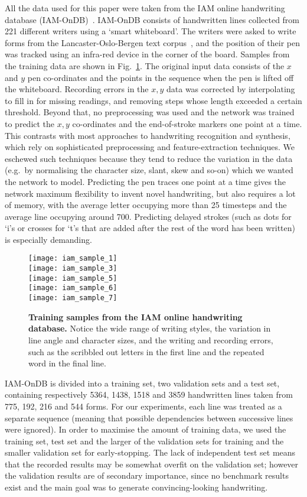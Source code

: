 \documentclass{article}
\newcommand{\eg}{e.g.\ }
\newcommand{\flabel}[1]{\label{fig:#1}}
\newcommand{\fref}[1]{Fig.~\ref{fig:#1}}
\begin{document}
All the data used for this paper were taken from the IAM online handwriting database (IAM-OnDB)~\cite{liwicki05iam}.
IAM-OnDB consists of handwritten lines collected from 221 different writers using a `smart whiteboard'.
The writers were asked to write forms from the Lancaster-Oslo-Bergen text corpus~\cite{lob}, and the position of their pen was tracked using an infra-red device in the corner of the board. 
Samples from the training data are shown in \fref{iam_data}.
The original input data consists of the $x$ and $y$ pen co-ordinates and the points in the sequence when the pen is lifted off the whiteboard.
Recording errors in the $x, y$ data was corrected by interpolating to fill in for missing readings, and removing steps whose length exceeded a certain threshold.
Beyond that, no preprocessing was used and the network was trained to predict the $x, y$ co-ordinates and the end-of-stroke markers one point at a time.
This contrasts with most approaches to handwriting recognition and synthesis, which rely on sophisticated preprocessing and feature-extraction techniques.
We eschewed such techniques because they tend to reduce the variation in the data (\eg by normalising the character size, slant, skew and so-on) which we wanted the network to model.
Predicting the pen traces one point at a time gives the network maximum flexibility to invent novel handwriting, but also requires a lot of memory, with the average letter occupying more than 25 timesteps and the average line occupying around 700.
Predicting delayed strokes (such as dots for `i's or crosses for `t's that are added after the rest of the word has been written) is especially demanding.

\begin{figure}
\texttt{[image: iam\_sample\_1]}\\
\texttt{[image: iam\_sample\_3]}\\
\texttt{[image: iam\_sample\_5]}\\
\texttt{[image: iam\_sample\_6]}\\
\texttt{[image: iam\_sample\_7]}
\caption{\textbf{Training samples from the IAM online handwriting database.} Notice the wide range of writing styles, the variation in line angle and character sizes, and the writing and recording errors, such as the scribbled out letters in the first line and the repeated word in the final line.}
\flabel{iam_data}
\end{figure}

IAM-OnDB is divided into a training set, two validation sets and a test set, containing respectively 5364, 1438, 1518 and 3859 handwritten lines taken from 775, 192, 216 and 544 forms. 
For our experiments, each line was treated as a separate sequence (meaning that possible dependencies between successive lines were ignored).
In order to maximise the amount of training data, we used the training set, test set and the larger of the validation sets for training and the smaller validation set for early-stopping.
The lack of independent test set means that the recorded results may be somewhat overfit on the validation set; however the validation results are of secondary importance, since no benchmark results exist and the main goal was to generate convincing-looking handwriting.
\end{document}

